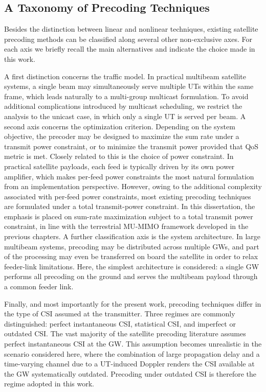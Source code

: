 \subsection*{A Taxonomy of Precoding Techniques}

Besides the distinction between linear and nonlinear techniques, existing satellite precoding methods can be classified along several other non-exclusive axes. For each axis we briefly recall the main alternatives and indicate the choice made in this work.

A first distinction concerns the traffic model. In practical multibeam satellite systems, a single beam may simultaneously serve multiple \acp{UT} within the same frame, which leads naturally to a multi-group multicast formulation. 
To avoid additional complications introduced by multicast scheduling, we restrict the analysis to the unicast case, in which only a single \ac{UT} is served per beam.
A second axis concerns the optimization criterion. Depending on the system objective, the precoder may be designed to maximize the sum rate under a transmit power constraint, or to minimize the transmit power provided that \ac{QoS} metric is met.
Closely related to this is the choice of power constraint. In practical satellite payloads, each feed is typically driven by its own power amplifier, which makes per-feed power constraints the most natural formulation from an implementation perspective.
However, owing to the additional complexity associated with per-feed power constraints, most existing precoding techniques are formulated under a total transmit-power constraint.
In this dissertation, the emphasis is placed on sum-rate maximization subject to a total transmit power constraint, in line with the terrestrial \ac{MU}-\ac{MIMO} framework developed in the previous chapters.
A further classification axis is the system architecture. 
In large multibeam systems, precoding may be distributed across multiple \acp{GW}, and part of the processing may even be transferred on board the satellite in order to relax feeder-link limitations. 
Here, the simplest architecture is considered: a single \ac{GW} performs all precoding on the ground and serves the multibeam payload through a common feeder link.

Finally, and most importantly for the present work, precoding techniques differ in the type of \ac{CSI} assumed at the transmitter. 
Three regimes are commonly distinguished: perfect instantaneous \ac{CSI}, statistical \ac{CSI}, and imperfect or outdated \ac{CSI}. 
The vast majority of the satellite precoding literature assumes perfect instantaneous \ac{CSI} at the \ac{GW}.
This assumption becomes unrealistic in the scenario considered here, where the combination of large propagation delay and a time-varying channel due to a \ac{UT}-induced Doppler renders the \ac{CSI} available at the \ac{GW} systematically outdated.
Precoding under outdated \ac{CSI} is therefore the regime adopted in this work.


